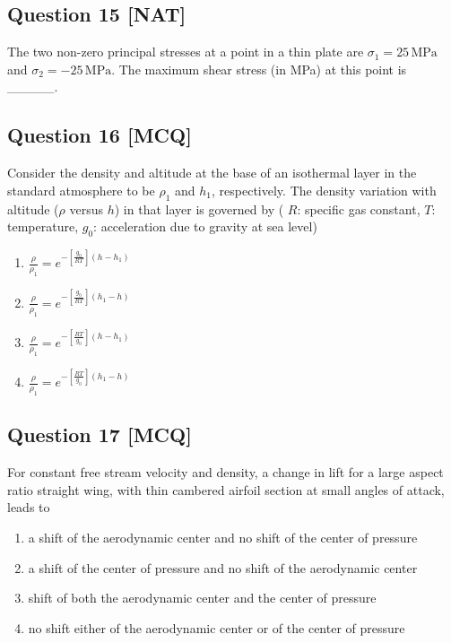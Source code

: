 \documentclass[12pt,a4paper]{article}
\begin{document}
\subsection*{Question 15 [NAT]}
The two non-zero principal stresses at a point in a thin plate are 
\(\sigma_1 = 25\, \text{MPa}\) and \(\sigma_2 = -25\, \text{MPa}\). 
The maximum shear stress (in MPa) at this point is \_\_\_\_\_.

\subsection*{Question 16 [MCQ]}
Consider the density and altitude at the base of an isothermal layer in the standard atmosphere to be \(\rho_1\) and \(h_1\), respectively. The density variation with altitude (\(\rho\) versus \(h\)) in that layer is governed by ( \(R\): specific gas constant, \(T\): temperature, \(g_0\): acceleration due to gravity at sea level)

\begin{enumerate}[label=(\alph*)]
\item \(\frac{\rho}{\rho_1} = e^{-\left[\frac{g_0}{RT}\right](h - h_1)}\)
\item \(\frac{\rho}{\rho_1} = e^{-\left[\frac{g_0}{RT}\right](h_1 - h)}\)
\item \(\frac{\rho}{\rho_1} = e^{-\left[\frac{RT}{g_0}\right](h - h_1)}\)
\item \(\frac{\rho}{\rho_1} = e^{-\left[\frac{RT}{g_0}\right](h_1 - h)}\)
\end{enumerate}



\subsection*{Question 17 [MCQ]}
 For constant free stream velocity and density, a change in lift for a large aspect ratio straight wing, with thin cambered airfoil section at small angles of attack, leads to 
\begin{enumerate}[label=(\alph*)]
\item  a shift of the aerodynamic center and no shift of the center of pressure
\item  a shift of the center of pressure and no shift of the aerodynamic center
\item   shift of both the aerodynamic center and the center of pressure
\item  no shift either of the aerodynamic center or of the center of pressure  
\end{enumerate}
\end{document}
